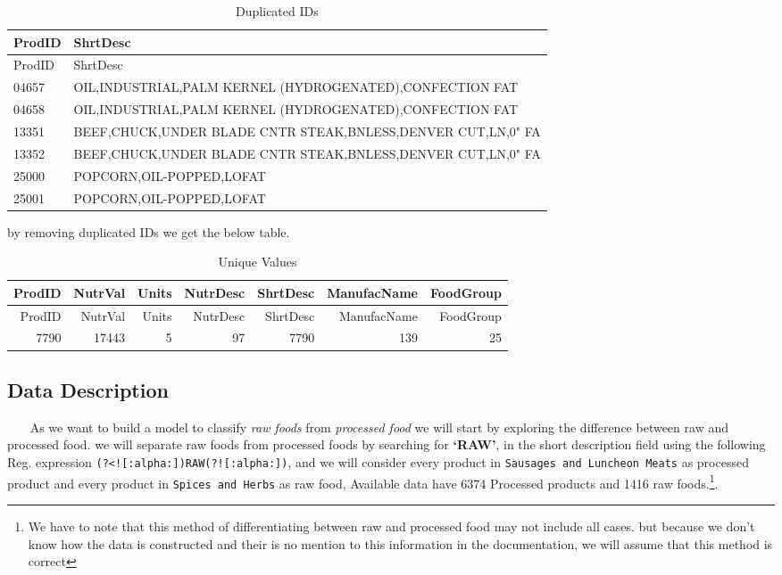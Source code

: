 \documentclass[]{article}
\let\rmarkdownfootnote\footnote%
\def\footnote{\protect\rmarkdownfootnote}
\begin{document}
\begin{longtable}[]{@{}ll@{}}
\caption{Duplicated IDs}\tabularnewline
\toprule
ProdID & ShrtDesc\tabularnewline
\midrule
\endfirsthead
\toprule
ProdID & ShrtDesc\tabularnewline
\midrule
\endhead
04657 & OIL,INDUSTRIAL,PALM KERNEL (HYDROGENATED),CONFECTION
FAT\tabularnewline
04658 & OIL,INDUSTRIAL,PALM KERNEL (HYDROGENATED),CONFECTION
FAT\tabularnewline
13351 & BEEF,CHUCK,UNDER BLADE CNTR STEAK,BNLESS,DENVER CUT,LN,0"
FA\tabularnewline
13352 & BEEF,CHUCK,UNDER BLADE CNTR STEAK,BNLESS,DENVER CUT,LN,0"
FA\tabularnewline
25000 & POPCORN,OIL-POPPED,LOFAT\tabularnewline
25001 & POPCORN,OIL-POPPED,LOFAT\tabularnewline
\bottomrule
\end{longtable}

by removing duplicated IDs we get the below table.

\begin{longtable}[]{@{}rrrrrrr@{}}
\caption{Unique Values}\tabularnewline
\toprule
ProdID & NutrVal & Units & NutrDesc & ShrtDesc & ManufacName &
FoodGroup\tabularnewline
\midrule
\endfirsthead
\toprule
ProdID & NutrVal & Units & NutrDesc & ShrtDesc & ManufacName &
FoodGroup\tabularnewline
\midrule
\endhead
7790 & 17443 & 5 & 97 & 7790 & 139 & 25\tabularnewline
\bottomrule
\end{longtable}

\hypertarget{data-description}{%
\subsection{Data Description}\label{data-description}}

~~~ As we want to build a model to classify \emph{raw foods} from
\emph{processed food} we will start by exploring the difference between
raw and processed food. we will separate raw foods from processed foods
by searching for \textbf{`RAW'}, in the short description field using
the following Reg. expression
\texttt{\textquotesingle{}(?\textless{}!{[}:alpha:{]})RAW(?!{[}:alpha:{]})\textquotesingle{}},
and we will consider every product in
\texttt{Sausages\ and\ Luncheon\ Meats} as processed product and every
product in \texttt{Spices\ and\ Herbs} as raw food, Available data have
6374 Processed products and 1416 raw foods.\footnote{We have to note
  that this method of differentiating between raw and processed food may
  not include all cases. but because we don't know how the data is
  constructed and their is no mention to this information in the
  documentation, we will assume that this method is correct}.
\end{document}
